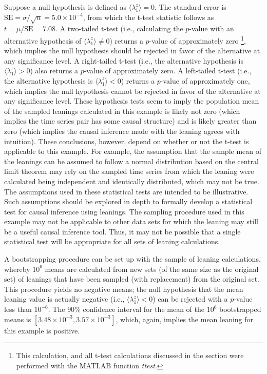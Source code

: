 \documentclass[twocolumn,aps,pre,groupedaddress]{revtex4-1}
\begin{document}
Suppose a null hypothesis is defined as $\langle\lambda_1^z\rangle = 0$.  The standard error is $\mathrm{SE}=\sigma/\sqrt{n}= 5.0\times 10^{-4}$, from which the t-test statistic follows \cite{Casella2002} as $t=\mu/\mathrm{SE}=7.08$.  A two-tailed t-test (i.e., calculating the $p$-value with an alternative hypothesis of $\langle\lambda_1^z\rangle \neq 0$) returns a $p$-value of approximately zero \footnote{This calculation, and all t-test calculations discussed in the section were performed with the {\sc MATLAB} function {\em ttest}.}, which implies the null hypothesis should be rejected in favor of the alternative at any significance level.  A right-tailed t-test (i.e., the alternative hypothesis is $\langle\lambda_1^z\rangle > 0$) also returns a $p$-value of approximately zero.  A left-tailed t-test (i.e., the alternative hypothesis is $\langle\lambda_1^z\rangle < 0$) returns a $p$-value of approximately one, which implies the null hypothesis cannot be rejected in favor of the alternative at any significance level.  These hypothesis tests seem to imply the population mean of the sampled leanings calculated in this example is likely not zero (which implies the time series pair has some causal structure) and is likely greater than zero (which implies the causal inference made with the leaning agrees with intuition).  These conclusions, however, depend on whether or not the t-test is applicable to this example.  For example, the assumption that the sample mean of the leanings can be assumed to follow a normal distribution based on the central limit theorem \cite{Casella2002} may rely on the sampled time series from which the leaning were calculated being independent and identically distributed, which may not be true.  The assumptions used in these statistical tests are intended to be illustrative.  Such assumptions should be explored in depth to formally develop a statistical test for causal inference using leanings.  The sampling procedure used in this example may not be applicable to other data sets for which the leaning may still be a useful causal inference tool.  Thus, it may not be possible that a single statistical test will be appropriate for all sets of leaning calculations.  

A bootstrapping \cite{Efron1994} procedure can be set up with the sample of leaning calculations, whereby $10^6$ means are calculated from new sets (of the same size as the original set) of leanings that have been sampled (with replacement) from the original set.  This procedure yields no negative means; the null hypothesis that the mean leaning value is actually negative (i.e., $\langle\lambda_1^z\rangle < 0$) can be rejected with a $p$-value less than $10^{-6}$.  The $90\%$ confidence interval for the mean of the $10^6$ bootstrapped means is $[3.48\times 10^{-3},3.57\times 10^{-3}]$, which, again, implies the mean leaning for this example is positive.    
\end{document}

